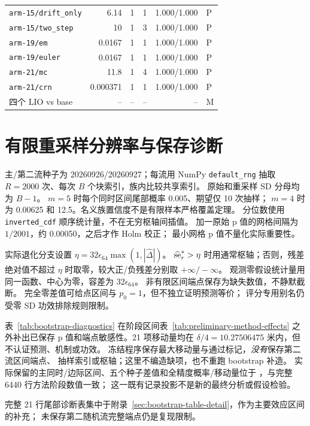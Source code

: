 \begin{longtable}{lrrrrl}
\texttt{arm-15/drift\_only} & 6.14 & 1 & 1 & 1.000/1.000 & P\\
\texttt{arm-15/two\_step} & 10 & 1 & 3 & 1.000/1.000 & P\\
\texttt{arm-19/em} & 0.0167 & 1 & 1 & 1.000/1.000 & P\\
\texttt{arm-19/euler} & 0.0167 & 1 & 1 & 1.000/1.000 & P\\
\texttt{arm-21/mc} & 11.8 & 1 & 4 & 1.000/1.000 & P\\
\texttt{arm-21/crn} & 0.000371 & 1 & 1 & 1.000/1.000 & P\\
四个 LIO vs base & -- & -- & -- & -- & M\\
\end{longtable}


\section{有限重采样分辨率与保存诊断}
\label{sec:bootstrap-resolution}\hypertarget{sec:bootstrap-resolution}{}
主/第二流种子为 20260926/20260927；每流用 NumPy \texttt{default\_rng}
抽取 \(R=2000\) 次、每次 \(B\) 个块索引，族内比较共享索引。
原始和重采样 SD 分母均为 \(B-1\)。
\(m=5\) 时每个同时区间尾部概率 0.005、期望仅 10 次抽样；
\(m=4\) 时为 0.00625 和 12.5。名义族置信度不是有限样本严格覆盖定理。
分位数使用 \texttt{inverted\_cdf} 顺序统计量，不在无穷枢轴间插值。
加一原始 p 值的网格间隔为 \(1/2001\)，约 0.00050，之后才作 Holm 校正；
最小网格 p 值不量化实际重要性。

实际退化分支设置 \(\eta=32\epsilon_{64}\max(1,|\widehat\Delta|)\)。
\(\widehat{\rm se}_r^*>\eta\) 时用通常枢轴；否则，残差绝对值不超过
\(\eta\) 时取零，较大正/负残差分别取 \(+\infty/-\infty\)。
观测零假设统计量用同一函数、中心为零，容差为 \(32\epsilon_{64}\)。
非有限区间端点保存为缺失数值，不静默截断。
完全零差值可给点区间与 \(p_0=1\)，但不独立证明预测等价；
评分专用别名仍受零 SD 功效排除规则限制。

表~\ref{tab:bootstrap-diagnostics} 在阶段区间表~\ref{tab:preliminary-method-effects}
之外补出已保存 p 值和端点敏感性。21 项移动量均在
\(\delta/4=10.27506475\) 米内，但不认证预测、机制或功效。
冻结程序保存最大移动量与通过标记，\emph{没有}保存第二流区间端点、
抽样索引或枢轴；这里不编造缺项，也不重跑 bootstrap 补造。
实际保留的主同时/边际区间、五个种子差值和全精度概率/移动量位于
，与完整 6440 行方法阶段数值一致；
这一既有记录投影不是新的最终分析或假设检验。

完整 21 行尾部诊断表集中于附录~\ref{sec:bootstrap-table-detail}，作为主要效应区间的补充；
未保存第二随机流完整端点仍是复现限制。


